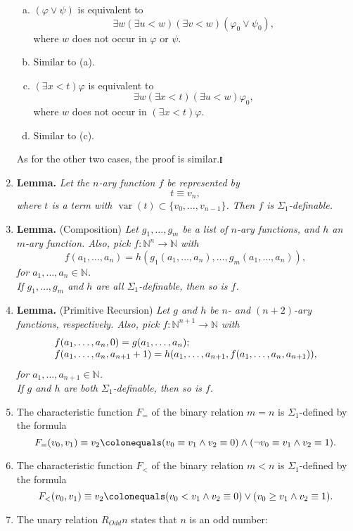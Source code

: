 \documentclass[leqno]{report}
\newcommand{\nat}{\mathbb{N}}
\newcommand{\var}[1]{\mathop{\mathrm{var}}(#1)}
\begin{document}
\begin{enumerate}[1.]
\begin{enumerate}[(a)]
\item $(\varphi \lor \psi)$ is equivalent to
\[
\exists w (\exists u < w)(\exists v < w)( \varphi_0 \lor \psi_0 ),
\]
where $w$ does not occur in $\varphi$ or $\psi$.
\item Similar to (a).
\item $(\exists x < t)\varphi$ is equivalent to
\[
\exists w (\exists x < t)(\exists u < w)\varphi_0,
\]
where $w$ does not occur in $(\exists x < t)\varphi$.
\item Similar to (c).
\end{enumerate}
As for the other two cases, the proof is similar.\nolinebreak\hfill$\talloblong$
%
\item \textbf{Lemma.} \emph{Let the $n$-ary function $f$ be represented by
\[
t \equiv v_n,
\]
where $t$ is a term with $\var{t} \subset \{ v_0, \ldots, v_{n - 1} \}$. Then $f$ is $\Sigma_1$-definable.}
%
\item \textbf{Lemma.} (Composition) \emph{Let $g_1, \ldots, g_m$ be a list of $n$-ary functions, and $h$ an $m$-ary function. Also, pick $f : \nat^n \to \nat$ with
\[
f(a_1, \ldots, a_n) = h(g_1(a_1, \ldots, a_n), \ldots, g_m(a_1, \ldots, a_n)),
\]
for $a_1, \ldots, a_n \in \nat$.\\
If $g_1, \ldots, g_m$ and $h$ are all $\Sigma_1$-definable, then so is $f$.}
%
\item \textbf{Lemma.} (Primitive Recursion) \emph{Let $g$ and $h$ be $n$- and $(n + 2)$-ary functions, respectively. Also, pick $f : \nat^{n + 1} \to \nat$ with
\[
\begin{array}{l}
f(a_1, \ldots, a_n, 0) = g(a_1, \ldots, a_n);\cr
f(a_1, \ldots, a_n, a_{n + 1} + 1) = h(a_1, \ldots, a_{n + 1}, f(a_1, \ldots, a_n, a_{n + 1})),
\end{array}
\]
for $a_1, \ldots, a_{n + 1} \in \nat$.\\
If $g$ and $h$ are both $\Sigma_1$-definable, then so is $f$.}
%
\item The characteristic function $F_=$ of the binary relation $m = n$ is $\Sigma_1$-defined by the formula
\[
F_= (v_0, v_1) \equiv v_2 \colonequals (v_0 \equiv v_1 \land v_2 \equiv 0) \land (\neg v_0 \equiv v_1 \land v_2 \equiv 1).
\]
%
\item The characteristic function $F_<$ of the binary relation $m < n$ is $\Sigma_1$-defined by the formula
\[
F_<(v_0, v_1) \equiv v_2 \colonequals (v_0 < v_1 \land v_2 \equiv 0) \lor (v_0 \geq v_1 \land v_2 \equiv 1).
\]
%
\item The unary relation $R_{Odd} n$ states that $n$ is an odd number:

\end{enumerate}
\end{document}
